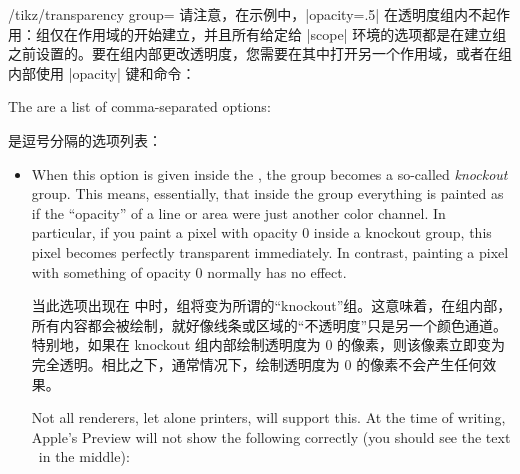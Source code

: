 \begin{key}{/tikz/transparency group=}
    请注意，在示例中，|opacity=.5| 在透明度组内不起作用：组仅在作用域的开始建立，并且所有给定给 |{scope}| 环境的选项都是在建立组之前设置的。要在组内部更改透明度，您需要在其中打开另一个作用域，或者在组内部使用 |opacity| 键和命令：


\begin{codeexample}[preamble={\usetikzlibrary{patterns,shapes.symbols}}]
\end{codeexample}

    The  are a list of comma-separated options:
    
     是逗号分隔的选项列表：


    \begin{itemize}
        \item {} When this option is given inside the
            , the group becomes a so-called \emph{knockout}
            group. This means, essentially, that inside the group everything is
            painted as if the ``opacity'' of a line or area were just another
            color channel. In particular, if you paint a pixel with opacity $0$
            inside a knockout group, this pixel becomes perfectly transparent
            immediately. In contrast, painting a pixel with something of
            opacity $0$ normally has no effect.

             当此选项出现在  中时，组将变为所谓的“knockout”组。这意味着，在组内部，所有内容都会被绘制，就好像线条或区域的“不透明度”只是另一个颜色通道。特别地，如果在 knockout 组内部绘制透明度为 $0$ 的像素，则该像素立即变为完全透明。相比之下，通常情况下，绘制透明度为 $0$ 的像素不会产生任何效果。



            Not all renderers, let alone printers, will support this. At the
            time of writing, Apple's Preview will not show the following
            correctly (you should see the text \tikzname\ in the middle):
            

\end{itemize}
\end{key}
